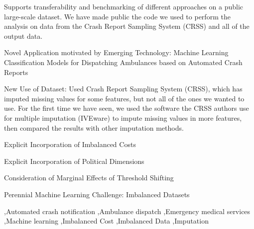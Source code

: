 \documentclass[fleqn]{cas-sc}
\begin{document}
\begin{graphicalabstract}



\end{graphicalabstract}

\begin{highlights}
	\item  Supports transferability and benchmarking of different approaches on a public large-scale dataset.  We have made public the code we used to perform the analysis on data from the Crash Report Sampling System (CRSS) and all of the output data.  
	\item Novel Application motivated by Emerging Technology:  Machine Learning Classification Models for Dispatching Ambulances based on Automated Crash Reports
	\item New Use of Dataset:  Used Crash Report Sampling System (CRSS), which has imputed missing values for some features, but not all of the ones we wanted to use.  For the first time we have seen, we used the software the CRSS authors use for multiple imputation (IVEware) to impute missing values in more features, then compared the results with other imputation methods.
	\item Explicit Incorporation of Imbalanced Costs
	\item Explicit Incorporation of Political Dimensions
	\item Consideration of Marginal Effects of Threshold Shifting
	\item Perennial Machine Learning Challenge:  Imbalanced Datasets
\end{highlights}

\begin{keywords}
 \sep Automated crash notification 
 \sep Ambulance dispatch 
 \sep Emergency medical services  
 \sep Machine learning 
 \sep Imbalanced Cost 
 \sep Imbalanced Data 
 \sep Imputation
\end{keywords}

\maketitle


%
%
%

\end{document}

